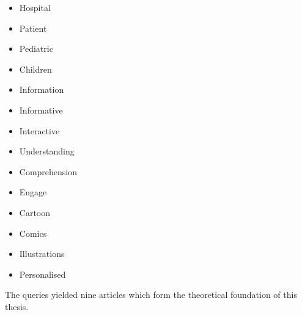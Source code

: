 \begin{multicols}{3}
    \raggedcolumns
    \begin{itemize}
        \item Hospital
        \item Patient
        \item Pediatric
        \item Children
        \item Information
        \item Informative
        \item Interactive
        \item Understanding
        \item Comprehension
        \item Engage
        \item Cartoon
        \item Comics
        \item Illustrations
        \item Personalised
    \end{itemize}
\end{multicols}

The queries yielded nine articles which form the theoretical foundation of this thesis.

